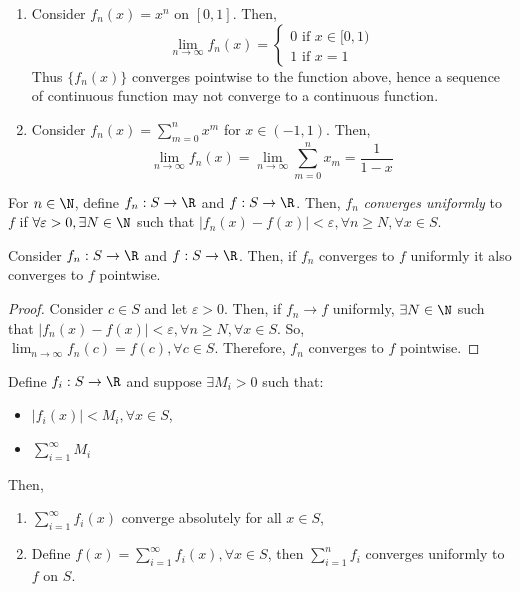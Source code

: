 \begin{enumerate}
    \item Consider $f_n(x) = x^n$ on $[0,1]$. Then,
        \begin{equation*}
            \lim \limits_{n \to \infty} f_n(x) = \begin{cases}
                0 \text{ if } x \in [0,1) \\
                1 \text{ if } x=1
            \end{cases}
        \end{equation*}
        Thus $\{f_n(x)\}$ converges pointwise to the function above, hence a sequence of continuous function may not converge to a continuous function.
    \item Consider $f_n(x) = \sum_{m=0}^n x^m$ for $x \in (-1,1)$. Then,
        \begin{equation*}
            \lim \limits_{n \to \infty} f_n(x) = \lim \limits_{n \to \infty} \sum \limits_{m=0}^n x_m = \frac{1}{1-x}
        \end{equation*}
\end{enumerate}

\begin{definition}
    For $n \in \N$, define $f_n: S \to \R$ and $f: S \to \R$. Then, $f_n$ \emph{converges uniformly} to $f$ if $\forall \varepsilon > 0, \exists N \in \N$ such that $|f_n(x) - f(x)| < \varepsilon, \forall n \geq N, \forall x \in S$.
\end{definition}

\begin{theorem}
    Consider $f_n: S \to \R$ and $f: S \to \R$. Then, if $f_n$ converges to $f$ uniformly it also converges to $f$ pointwise.
\end{theorem}

\begin{proof}
    Consider $c \in S$ and let $\varepsilon > 0$. Then, if $f_n \to f$ uniformly, $\exists N \in \N$ such that $|f_n(x) - f(x)| < \varepsilon, \forall n \geq N, \forall x \in S$. So, $\lim_{n \to \infty} f_n(c) = f(c), \forall c \in S$. Therefore, $f_n$ converges to $f$ pointwise.
\end{proof}

\begin{theorem}
    Define $f_i: S \to \R$ and suppose $\exists M_i > 0$ such that:
    \begin{itemize}
        \item $|f_i(x)| < M_i, \forall x \in S$,
        \item $\sum_{i=1}^\infty M_i$
    \end{itemize}
    Then,
    \begin{enumerate}
        \item $\sum_{i=1}^\infty f_i(x)$ converge absolutely for all $x \in S$,
        \item Define $f(x) = \sum_{i = 1}^\infty f_i(x), \forall x \in S$, then $\sum_{i=1}^n f_i$ converges uniformly to $f$ on $S$.
    \end{enumerate}
\end{theorem}


